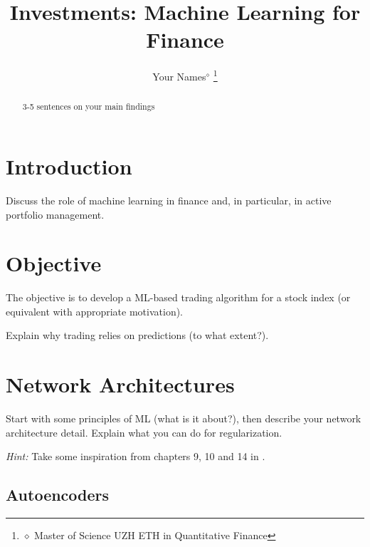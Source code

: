 \documentclass[conference]{IEEEtran}
\begin{document}
\title{Investments: Machine Learning for Finance}
\author{Your Names$^{\diamond}$
\thanks{$\diamond$ Master of Science UZH ETH in Quantitative Finance}}
\maketitle

\begin{abstract}
3-5 sentences on your main findings
\vspace{10ex}
\end{abstract}

\section{Introduction}

Discuss the role of machine learning in finance and, in particular, in active portfolio management. 
\vspace{5ex}

\section{Objective}

The objective is to develop a ML-based trading algorithm for a stock index (or equivalent with appropriate motivation). 

\vspace{2ex}
\noindent
Explain why trading relies on predictions (to what extent?).  
\vspace{5ex}


\section{Network Architectures}

Start with some principles of ML (what is it about?), then describe your network architecture detail. Explain what you can do for regularization. 

\vspace{2ex}
\noindent
\textit{Hint:} Take some inspiration from chapters 9, 10 and 14 in \cite{goodfellow2016deep}.

\subsection{Autoencoders}

\vspace{5ex}
\end{document}
